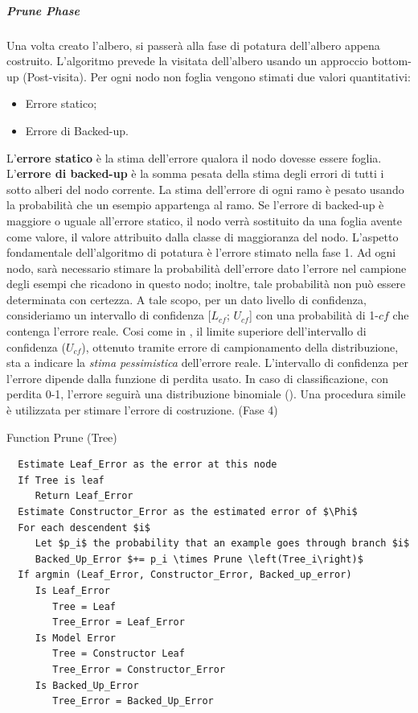 \subparagraph{Prune Phase}
	Una volta creato l'albero, si passerà alla fase di potatura dell'albero appena costruito. L'algoritmo prevede la visitata dell'albero usando un approccio bottom-up (Post-visita). Per ogni nodo non foglia vengono stimati due valori quantitativi: 
\begin{itemize}
	\item Errore statico;
	\item Errore di Backed-up.
\end{itemize}
L'\textbf{errore statico} è la stima dell'errore qualora il nodo dovesse essere foglia.
L'\textbf{errore di backed-up} è la somma pesata della stima degli errori di tutti i sotto alberi del nodo corrente. La stima dell'errore di ogni ramo è pesato usando la probabilità che un esempio appartenga al ramo. Se l'errore di backed-up è maggiore o uguale all'errore statico, il nodo verrà sostituito da una foglia avente come valore, il valore attribuito dalla classe di maggioranza del nodo. L'aspetto fondamentale dell'algoritmo di potatura è l'errore stimato nella fase 1. Ad ogni nodo, sarà necessario stimare la probabilità dell'errore dato l'errore nel campione degli esempi che ricadono in questo nodo; inoltre, tale probabilità non può essere determinata con certezza. A tale scopo, per un dato livello di confidenza, consideriamo un intervallo di confidenza [$L_{cf}$; $U_{cf}$] con una probabilità di 1-$cf$ che contenga l'errore reale. Cosi come in \cite{Quinlan:1993a}, il limite superiore dell'intervallo di confidenza ($U_{cf}$), ottenuto tramite errore di campionamento della distribuzione, sta a indicare la \emph{stima pessimistica} dell'errore reale. L'intervallo di confidenza per l'errore dipende dalla funzione di perdita usato. In caso di classificazione, con perdita 0-1, l'errore seguirà una distribuzione binomiale (\cite{mitchellbook}).
Una procedura simile è utilizzata per stimare l'errore di costruzione. (Fase 4)


\begin{algorithm}
	\caption{Function Prune (Tree)}
	\begin{lstlisting}
  Estimate Leaf_Error as the error at this node
  If Tree is leaf 
     Return Leaf_Error
  Estimate Constructor_Error as the estimated error of $\Phi$
  For each descendent $i$
     Let $p_i$ the probability that an example goes through branch $i$
     Backed_Up_Error $+= p_i \times Prune \left(Tree_i\right)$
  If argmin (Leaf_Error, Constructor_Error, Backed_up_error)
     Is Leaf_Error
        Tree = Leaf
        Tree_Error = Leaf_Error
     Is Model Error
        Tree = Constructor Leaf
        Tree_Error = Constructor_Error
     Is Backed_Up_Error
        Tree_Error = Backed_Up_Error
	\end{lstlisting}
\end{algorithm}

